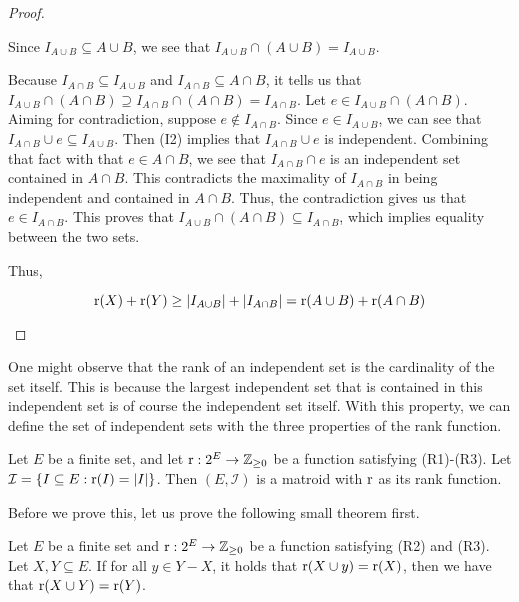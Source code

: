 \begin{proof}
\begin{enumerate}
        Since $I_{A\cup B}\subseteq A\cup B$, we see that $I_{A\cup B}\cap(A\cup B) = I_{A\cup B}$.

        Because $I_{A\cap B}\subseteq I_{A\cup B}$ and $I_{A\cap B}\subseteq A\cap B$, it tells us that $I_{A\cup B}\cap (A\cap B) \supseteq I_{A\cap B}\cap (A\cap B) = I_{A\cap B} $. Let $e\in I_{A\cup B}\cap (A\cap B)$. Aiming for contradiction, suppose $e\notin I_{A\cap B}$. Since $e\in I_{A\cup B}$, we can see that $I_{A\cap B}\cup e \subseteq I_{A\cup B} $. Then (I2) implies that $I_{A\cap B}\cup e$ is independent. Combining that fact with that $e\in A\cap B$, we see that $I_{A\cap B}\cap e$ is an independent set contained in $A\cap B$. This contradicts the maximality of $I_{A\cap B}$ in being independent and contained in $A\cap B$. Thus, the contradiction gives us that $e\in I_{A\cap B}$. This proves that $I_{A\cup B}\cap(A\cap B)\subseteq I_{A\cap B} $, which implies equality between the two sets.

        Thus,

        $$ \operatorname{r}(X)+\operatorname{r}(Y) \geq  |I_{A\cup B}|+|I_{A\cap B}| = \operatorname{r}(A\cup B)+\operatorname{r}(A\cap B) $$
    \end{enumerate}
\end{proof}
One might observe that the rank of an independent set is the cardinality of the set itself. This is because the largest independent set that is contained in this independent set is of course the independent set itself. With this property, we can define the set of independent sets with the three properties of the rank function.
\begin{theorem}
    \label{thm:indep-from-bases}
    Let $E$ be a finite set, and let $\operatorname{r} : 2^E \rightarrow \mathbb{Z}_{\geq0}$ be a function satisfying (R1)-(R3). Let $\mathcal{I} = \{ I\subseteq E : \operatorname{r}(I)=|I| \} $. Then $(E,\mathcal{I})$ is a matroid with $\operatorname{r}$ as its rank function.
\end{theorem}
Before we prove this, let us prove the following small theorem first.
\begin{theorem}
\label{rankextension}
    Let $E$ be a finite set and $\operatorname{r}:2^E\rightarrow \mathbb{Z}_{\geq0}$ be a function satisfying (R2) and (R3). Let $X,Y\subseteq E$. If for all $y\in Y-X$, it holds that $\operatorname{r}(X\cup y)=\operatorname{r}(X)$, then we have that $\operatorname{r}(X\cup Y)=\operatorname{r}(Y)$.
\end{theorem}
